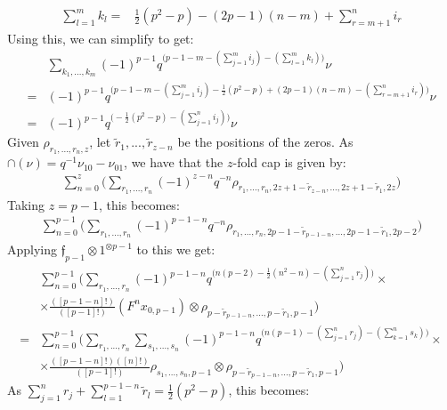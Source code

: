\documentclass[]{article}
\begin{document}
\begin{align*}
\sum\limits_{l=1}^{m}k_{l}=&\frac{1}{2}(p^{2}-p)-(2p-1)(n-m)+\sum\limits_{r=m+1}^{n}i_{r}
\end{align*}
Using this, we can simplify to get:
\begin{align*}
&\sum\limits_{k_{1},...,k_{m}}(-1)^{p-1}q^{\big(p-1-m-(\sum\limits_{j=1}^{m}i_{j})-(\sum\limits_{l=1}^{m}k_{l})\big)}\nu\\
=&(-1)^{p-1}q^{\big(p-1-m-(\sum\limits_{j=1}^{m}i_{j})-\frac{1}{2}(p^{2}-p)+(2p-1)(n-m)-(\sum\limits_{r=m+1}^{n}i_{r})\big)}\nu\\
=&(-1)^{p-1}q^{\big(-\frac{1}{2}(p^{2}-p)-(\sum\limits_{j=1}^{n}i_{j})\big)}\nu
\end{align*}
Given $\rho_{r_{1},...,r_{n},z}$, let $\tilde{r}_{1},...,\tilde{r}_{z-n}$ be the positions of the zeros. As $\cap(\nu)=q^{-1}\nu_{10}-\nu_{01}$, we have that the $z$-fold cap is given by:
\begin{align*}
\sum\limits_{n=0}^{z}\bigg(\sum\limits_{r_{1},...,r_{n}}(-1)^{z-n}q^{-n}\rho_{r_{1},...,r_{n},2z+1-\tilde{r}_{z-n},...,2z+1-\tilde{r}_{1},2z}\bigg)
\end{align*}
Taking $z=p-1$, this becomes:
\begin{align*}
\sum\limits_{n=0}^{p-1}\bigg(\sum\limits_{r_{1},...,r_{n}}(-1)^{p-1-n}q^{-n}\rho_{r_{1},...,r_{n},2p-1-\tilde{r}_{p-1-n},...,2p-1-\tilde{r}_{1},2p-2}\bigg)
\end{align*}
Applying $\mathfrak{f}_{p-1}\otimes 1^{\otimes p-1}$ to this we get:
\begin{align*}
&\sum\limits_{n=0}^{p-1}\bigg(\sum\limits_{r_{1},...,r_{n}}(-1)^{p-1-n}q^{\big(n(p-2)-\frac{1}{2}(n^{2}-n)-(\sum\limits_{j=1}^{n}r_{j})\big)}\times\\
&\times\frac{([p-1-n]!)}{([p-1]!)}(F^{n}x_{0,p-1})\otimes\rho_{p-\tilde{r}_{p-1-n},...,p-\tilde{r}_{1},p-1}\bigg)\\
=&\sum\limits_{n=0}^{p-1}\bigg(\sum\limits_{r_{1},...,r_{n}}\sum\limits_{s_{1},...,s_{n}}(-1)^{p-1-n}q^{\big(n(p-1)-(\sum\limits_{j=1}^{n}r_{j})-(\sum\limits_{k=1}^{n}s_{k})\big)}\times\\
&\times\frac{([p-1-n]!)([n]!)}{([p-1]!)}\rho_{s_{1},...,s_{n},p-1}\otimes\rho_{p-\tilde{r}_{p-1-n},...,p-\tilde{r}_{1},p-1}\bigg)
\end{align*}
As $\sum\limits_{j=1}^{n}r_{j}+\sum\limits_{l=1}^{p-1-n}\tilde{r}_{l}=\frac{1}{2}(p^{2}-p)$, this becomes:
\end{document}
